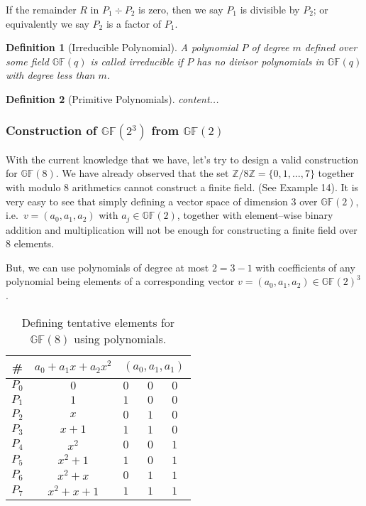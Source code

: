 \documentclass[12pt]{article}
\newtheorem{definition}{Definition}
\newcommand{\Zn}[1]{\mathds{Z}/#1\mathds{Z}}
\newcommand{\gf}[1]{\mathds{GF}\left(#1\right)} %
\begin{document}
If the remainder $R$ in $P_1 \div P_2$ is zero, then we say $P_1$ is divisible by $P_2$; or equivalently we say $P_2$ is a factor of $P_1$.





\begin{definition}[Irreducible Polynomial]
	A polynomial $P$ of degree $m$ defined over some field $\gf{q}$ is called irreducible if $P$ has no divisor polynomials in $\gf{q}$ with degree less than $m$.
\end{definition}

\begin{definition}[Primitive Polynomials]
	content...
\end{definition}



\subsubsection{Construction of $\gf{2^3}$ from $\gf{2}$}

With the current knowledge that we have, let's try to design a valid construction for $\gf{8}$. We have already observed that the set $\Zn{8} = \{0,1,\ldots,7\}$ together with modulo $8$ arithmetics cannot construct a finite field. (See Example 14). It is very easy to see that simply defining a vector space of dimension $3$ over $\gf{2}$, i.e.\ $v=(a_0 , a_1, a_2)$ with $a_j\in\gf{2}$, together with element--wise binary addition and multiplication will not be enough for constructing a finite field over $8$ elements. 

But, we can use polynomials of degree at most $2 = 3-1$ with coefficients of any polynomial being elements of a corresponding vector $v=(a_0 , a_1, a_2) \in \gf{2}^3$.  

\begin{table}[h]
	\centering
	\begin{tabular}{|c|c|m{1em}|m{1em}|m{1em}|}
		\hline 
		\# & $a_0 + a_1 x + a_2 x^2$ &  \multicolumn{3}{c|}{$(a_0, a_1, a_1)$}  \\ 
		\hline \hline 
		$P_0$ & $0$ & $0$ & $0$ & $0$ \\ 
		\hline 
		$P_1$ & $1$ & $1$ & $0$ & $0$ \\ 
		\hline 
		$P_2$ & $x$ & $0$ & $1$ & $0$ \\ 
		\hline 
		$P_3$ & $x+1$ & $1$ & $1$ & $0$ \\ 
		\hline 
		$P_4$ & $x^2$ & $0$ & $0$ & $1$ \\ 
		\hline 
		$P_5$ & $x^2+1$ & $1$ & $0$ & $1$ \\ 
		\hline 
		$P_6$ & $x^2 + x$ & $0$ & $1$ & $1$ \\ 
		\hline 
		$P_7$ & $x^2 + x +1$ & $1$ & $1$ & $1$ \\ 
		\hline 
	\end{tabular} 
	\caption{Defining tentative elements for $\gf{8}$ using polynomials.}
\end{table}
\end{document}
